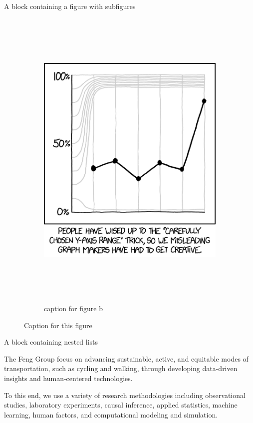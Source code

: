 \documentclass[final]{beamer}
\newlength{\colwidth}
\begin{document}
\begin{frame}[t]
\begin{columns}[t]
\begin{column}{\colwidth}
\begin{block}{A block containing a figure with subfigures}
\begin{figure}
\begin{subfigure}{0.49\textwidth}
        \includegraphics[height=15cm]{./images/y_axis_2x.png}
        \caption{caption for figure b}   %
      \end{subfigure}
      \caption{Caption for this figure}
    \end{figure}

  \end{block}

  \vspace{-1em}    %

  \begin{block}{A block containing nested lists}

    The Feng Group focus on advancing sustainable, active, and equitable modes of transportation, such as cycling and walking, 
    through developing data-driven insights and human-centered technologies.

    To this end, we use a variety of research methodologies including 
    observational studies, laboratory experiments, causal inference, applied statistics, machine learning, human factors, and computational modeling and simulation.


\end{block}
\end{column}
\end{columns}
\end{frame}
\end{document}
